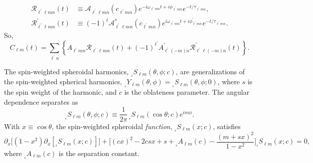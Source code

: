 \documentclass[11pt]{article}
\newcommand{\swY}[4][]{{}_{{}_{#2}}\!Y^{#1}_{#3}(#4)}
\newcommand{\swSH}[5][]{{}_{{}_{#2}}S^{#1}_{#3}(#4;#5)}
\newcommand{\swS}[5][]{{}_{{}_{#2}}S^{#1}_{#3}(#4;#5)}
\newcommand{\scA}[4][]{{}_{{}_{#2}}A^{#1}_{#3}(#4)}
\begin{document}
\begin{align}
  \mathcal{R}_{\ell^\prime\ell{m}n}(t) &\equiv 
    \mathcal{A}_{\ell^\prime\ell{m}n}(c_{\ell^\prime{m}n})
    e^{-i\omega_{\ell^\prime{m}n}t+i\phi_{\ell^\prime{m}n}}e^{-t/\tau_{\ell^\prime{m}n}}, \\
  \mathcal{R}^\prime_{\ell^\prime\ell{m}n}(t) &\equiv  
    (-1)^\ell\mathcal{A}^*_{\ell^\prime\ell{m}n}(c_{\ell^\prime{m}n})
    e^{i\omega_{\ell^\prime{m}n}t+i\phi^\prime_{\ell^\prime{m}n}}e^{-t/\tau_{\ell^\prime{m}n}}.
\end{align}
So,
\begin{equation}
 C_{\ell{m}}(t) = \sum_{\ell^\prime{n}} \left\{ 
   A_{\ell^\prime{m}n}\mathcal{R}_{\ell^\prime\ell{m}n}(t)
  + (-1)^{\ell^\prime}A^\prime_{\ell^\prime(-m)n}\mathcal{R}^\prime_{\ell^\prime\ell(-m)n}(t)
     \right\}.
\end{equation}

\newpage
{}
\vspace{0.25in}

The spin-weighted spheroidal harmonics,
$\swSH{s}{\ell{m}}{\theta,\phi}{c}$, are generalizations of the
spin-weighted spherical harmonics,
$\swY{s}{\ell{m}}{\theta,\phi}=\swSH{s}{\ell{m}}{\theta,\phi}{0}$,
where $s$ is the spin weight of the harmonic, and $c$ is the
oblateness parameter.  The angular dependence separates as
\begin{equation}
  \swSH{s}{\ell{m}}{\theta,\phi}{c} \equiv 
  \frac1{2\pi}\,\swS{s}{\ell{m}}{\cos\theta}{c}e^{im\phi}.
\end{equation}
With $x\equiv\cos\theta$, the spin-weighted spheroidal {\em function},
$\swS{s}{\ell{m}}{x}{c}$, satisfies
\begin{equation}\label{eqn:swSF_DiffEqn}
\partial_x \Big[ (1-x^2)\partial_x [\swS{s}{\ell{m}}{x}{c}]\Big] 
    + \bigg[(cx)^2 - 2 csx + s + \scA{s}{\ell m}{c} 
      - \frac{(m+sx)^2}{1-x^2}\bigg]\swS{s}{\ell{m}}{x}{c} = 0,
\end{equation}
where $\scA{s}{\ell m}{c}$ is the separation constant.
\end{document}
